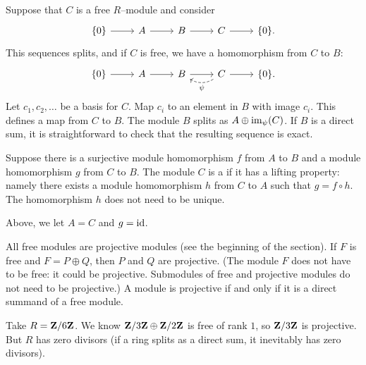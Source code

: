 \documentclass[11pt, oneside,margin=1in]{article}
\begin{document}
Suppose that $C$ is a free $R$--module and consider
\[
\begin{tikzcd}
	\{0\}\arrow[r] & A \arrow[r] & B\arrow[r]& C\arrow[r] & \{0\}.
\end{tikzcd}
\]
This sequences splits, and if $C$ is free, we have a homomorphism from $C$ to $B$:
\[
\begin{tikzcd}
        \{0\}\arrow[r] & A \arrow[r] & B\arrow[r]& C\arrow[r]\arrow[l, bend left, dashed, "\psi"] & \{0\}.
\end{tikzcd}
\]
Let $c_1,c_2,\hdots$ be a basis for $C$. Map $c_i$ to an element in $B$ with image $c_i$. This defines a map from $C$ to $B$. The module $B$ splits as $A \oplus \operatorname{im}_\psi (C)$. If $B$ is a direct sum, it is straightforward to check that the resulting sequence is exact.

\begin{definition}[ ]\label{}
Suppose there is a surjective module homomorphism $f$ from $A$ to $B$ and a module homomorphism $g$ from $C$ to $B$. The module $C$ is a  if it has a lifting property: namely there exists a module homomorphism $h$ from $C$ to $A$ such that $g = f \circ h$. The homomorphism $h$ does not need to be unique.
\end{definition}

Above, we let $A=C$ and $g=\operatorname{id}$.
\begin{example}\label{}
All free modules are projective modules (see the beginning of the section). If $F$ is free and $F=P\oplus Q$, then $P$ and $Q$ are projective. (The module $F$ does not have to be free: it could be projective. Submodules of free and projective modules do not need to be projective.\iffalse: take $k[x,y]$ and submodule $(x,y)$.\fi) A module is projective if and only if it is a direct summand of a free module.  
\end{example}

\begin{example}\label{}
Take $R=\mathbf Z / 6\mathbf Z$. We know $\mathbf Z / 3\mathbf Z\oplus \mathbf Z / 2\mathbf Z$ is free of rank $1$, so $\mathbf Z / 3\mathbf Z$ is projective. But $R$ has zero divisors (if a ring splits as a direct sum, it inevitably has zero divisors).
\end{example}
\end{document}
